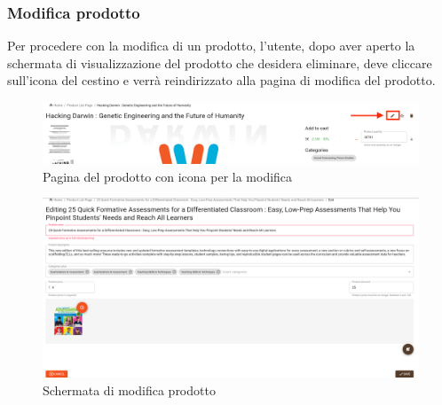 \subsubsection{Modifica prodotto}
Per procedere con la modifica di un prodotto, l'utente, dopo aver aperto la schermata di visualizzazione del prodotto che desidera eliminare, deve cliccare sull'icona del cestino e verrà reindirizzato alla pagina di modifica del prodotto.
\begin{figure}[H]
	\centering
	\includegraphics[scale=0.25]{Immagini/Venditore/pdp.sellermodify.png}
	\caption{Pagina del prodotto con icona per la modifica}
	\label{fig:ModificaP}
\end{figure}
\begin{figure}[H]
	\centering
	\includegraphics[scale=0.25]{Immagini/Venditore/pdp-edit.seller.png}
	\caption{Schermata di modifica prodotto}
	\label{fig:ModificaProdotto}
\end{figure}